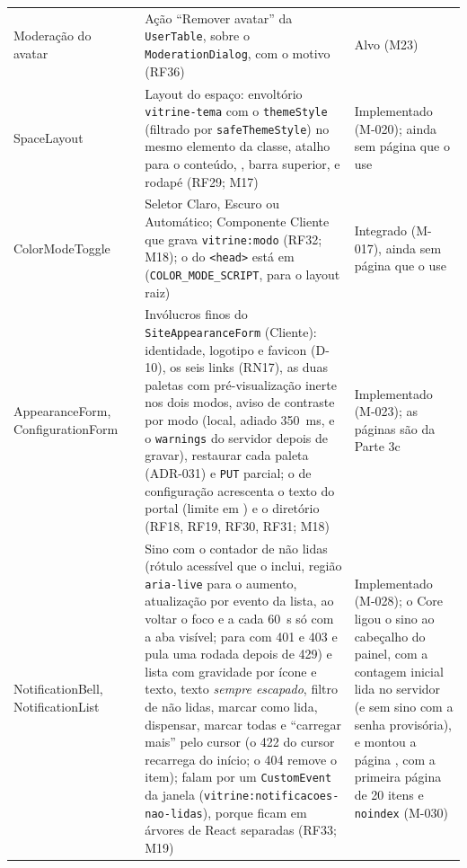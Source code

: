 \begin{longtable}{@{}L{3.3cm}L{2.9cm}L{6.0cm}L{2.2cm}@{}}
Moderação do avatar &  & Ação ``Remover avatar'' da \texttt{UserTable}, sobre o \texttt{ModerationDialog}, com o motivo (RF36) & Alvo (M23)\\
SpaceLayout &  & Layout do espaço: envoltório \texttt{vitrine-tema} com o \texttt{themeStyle} (filtrado por \texttt{safeThemeStyle}) no mesmo elemento da classe, atalho para o conteúdo, , barra superior,  e rodapé (RF29; M17) & Implementado (M-020); ainda sem página que o use\\
ColorModeToggle &  & Seletor Claro, Escuro ou Automático; Componente Cliente que grava \texttt{vitrine:modo} (RF32; M18); o  do \texttt{<head>} está em  (\texttt{COLOR\_MODE\_SCRIPT}, para o layout raiz) & Integrado (M-017), ainda sem página que o use\\
AppearanceForm, ConfigurationForm &  & Invólucros finos do \texttt{SiteAppearanceForm} (Cliente): identidade, logotipo e favicon (D-10), os seis links (RN17), as duas paletas com pré-visualização inerte nos dois modos, aviso de contraste por modo (local, adiado 350~ms, e o \texttt{warnings} do servidor depois de gravar), restaurar cada paleta (ADR-031) e \texttt{PUT} parcial; o de configuração acrescenta o texto do portal (limite em ) e o diretório (RF18, RF19, RF30, RF31; M18) & Implementado (M-023); as páginas são da Parte 3c\\
NotificationBell, NotificationList &  & Sino com o contador de não lidas (rótulo acessível que o inclui, região \texttt{aria-live} para o aumento, atualização por evento da lista, ao voltar o foco e a cada 60~s só com a aba visível; para com 401 e 403 e pula uma rodada depois de 429) e lista com gravidade por ícone e texto, texto \emph{sempre escapado}, filtro de não lidas, marcar como lida, dispensar, marcar todas e ``carregar mais'' pelo cursor (o 422 do cursor recarrega do início; o 404 remove o item); falam por um \texttt{CustomEvent} da janela (\texttt{vitrine:notificacoes-nao-lidas}), porque ficam em árvores de React separadas (RF33; M19) & Implementado (M-028); o Core ligou o sino ao cabeçalho do painel, com a contagem inicial lida no servidor (e sem sino com a senha provisória), e montou a página , com a primeira página de 20 itens e \texttt{noindex} (M-030)\\

\end{longtable}
